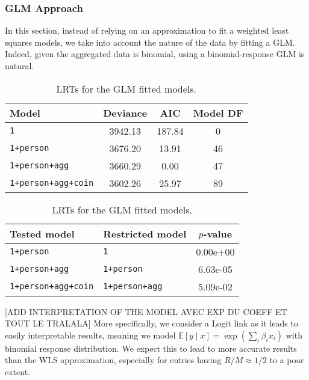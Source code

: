 \documentclass[a4paper, 12pt,oneside]{article}
\begin{document}
			\subsubsection{GLM Approach}
			In this section, instead of relying on an approximation to fit a weighted least squares models, we take into account the nature of the data by fitting a GLM. Indeed, given the aggregated data is binomial, using a binomial-response GLM is natural. 
			\begin{table}[htb]
				\centering
				\begin{subtable}{\textwidth}
					\centering
					\caption{Analysis of deviance of the GLM \texttt{1+person+agg+coin} model and AIC values.}
					\label{tab:glm-model-comparison}
					\begin{tabular}{lccc}
					\toprule
					Model & Deviance & AIC & Model DF \\
					\midrule
					\texttt{1} & 3942.13 & 187.84 & 0 \\
					\texttt{1+person} & 3676.20 & 13.91 & 46 \\
					\texttt{1+person+agg} & 3660.29 & 0.00 & 47 \\
					\texttt{1+person+agg+coin} & 3602.26 & 25.97 & 89 \\
					\bottomrule
					\end{tabular}
				\end{subtable}

				\begin{subtable}{\textwidth}
					\centering
					\caption{LRTs for the GLM fitted models.}
					\label{tab:glm-lrt-comparison}
					\begin{tabular}{llc}
					\toprule
					Tested model & Restricted model & $p$-value \\
					\midrule
					\texttt{1+person} & \texttt{1} & 0.00e+00 \\
					\texttt{1+person+agg} & \texttt{1+person} & 6.63e-05 \\
					\texttt{1+person+agg+coin} & \texttt{1+person+agg} & 5.09e-02 \\
					\bottomrule
					\end{tabular}
				\end{subtable}
			\end{table}

			[ADD INTERPRETATION OF THE MODEL AVEC EXP DU COEFF ET TOUT LE TRALALA]
			More specifically, we consider a Logit link as it leads to easily interpretable results, meaning we model $\mathbb{E}[y\mid x]=\exp\left(\sum_i \beta_i x_i\right)$ with binomial response distribution. We expect this to lead to more accurate results than the WLS approximation, especially for entries having $R/M\approx 1/2$ to a poor extent.
\end{document}
